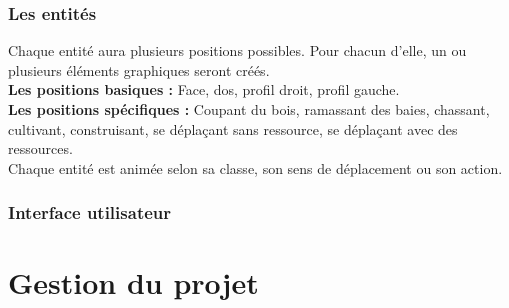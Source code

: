 \documentclass[a4paper]{memoir}
\begin{document}
			\subsection{Les entités}
				Chaque entité aura plusieurs positions possibles. Pour chacun d'elle, un ou plusieurs éléments graphiques seront créés.\\
				\textbf{Les positions basiques :} Face, dos, profil droit, profil gauche.\\
				\textbf{Les positions spécifiques :} Coupant du bois, ramassant des baies, chassant, cultivant, construisant, se déplaçant sans ressource, se déplaçant avec des ressources.\\
				Chaque entité est animée selon sa classe, son sens de déplacement ou son action.\\
	
			\subsection{Interface utilisateur}
		
	\chapter{Gestion du projet}
\end{document}
